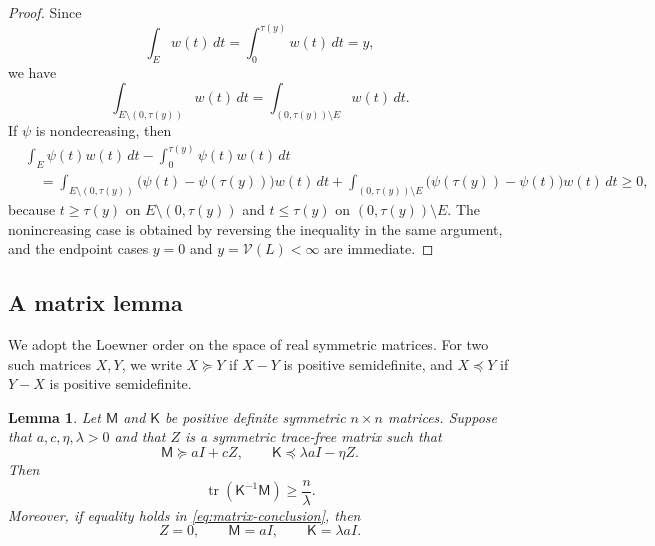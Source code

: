 \documentclass[10pt,a4paper]{amsart}
\newtheorem{lemma}[theorem]{Lemma}
\DeclareMathOperator{\tr}{tr}
\newcommand{\Id}{I}
\newcommand{\mcM}{\mathsf M}
\newcommand{\mcK}{\mathsf K}
\begin{document}
\begin{proof}
Since
$$
        \int_E w(t)\,dt
        =
        \int_0^{\tau(y)} w(t)\,dt
        =y,
$$
we have
$$
        \int_{E\setminus(0,\tau(y))}w(t)\,dt
        =
        \int_{(0,\tau(y))\setminus E}w(t)\,dt .
$$
If \(\psi\) is nondecreasing, then
$$
\begin{aligned}
&\int_E\psi(t)w(t)\,dt
-\int_0^{\tau(y)}\psi(t)w(t)\,dt  \\
&\quad =
\int_{E\setminus(0,\tau(y))}
        \bigl(\psi(t)-\psi(\tau(y))\bigr)w(t)\,dt
+
\int_{(0,\tau(y))\setminus E}
        \bigl(\psi(\tau(y))-\psi(t)\bigr)w(t)\,dt
\ge0,
\end{aligned}
$$
because \(t\ge\tau(y)\) on \(E\setminus(0,\tau(y))\) and
\(t\le\tau(y)\) on \((0,\tau(y))\setminus E\).  The nonincreasing case is obtained by reversing the
inequality in the same argument, and the endpoint cases \(y=0\) and
\(y=\mathcal V(L)<\infty\) are immediate.
\end{proof}

\subsection{A matrix lemma}

We adopt the Loewner order on the space of real symmetric matrices. For two such matrices \(X,Y\), we write \(X \succeq Y\) if \(X-Y\) is positive semidefinite, and \(X \preceq Y\) if \(Y-X\) is positive semidefinite.

\begin{lemma}\label{lem:matrix}
Let $\mcM$ and $\mcK$ be positive definite symmetric $n\times n$ matrices.  Suppose that $a,c,\eta,\lambda>0$ and that $Z$ is a symmetric trace-free matrix such that
\begin{equation}\label{eq:matrix-hyp}
        \mcM\succeq a\Id+cZ,
        \qquad
        \mcK\preceq \lambda a\Id-\eta Z.
\end{equation}
Then
\begin{equation}\label{eq:matrix-conclusion}
        \tr(\mcK^{-1}\mcM)\ge \frac{n}{\lambda}.
\end{equation}
Moreover, if equality holds in \eqref{eq:matrix-conclusion}, then
\begin{equation}\label{eq:matrix-equality-conclusion}
        Z=0,
        \qquad
        \mcM=a\Id,
        \qquad
        \mcK=\lambda a\Id.
\end{equation}
\end{lemma}
\end{document}

